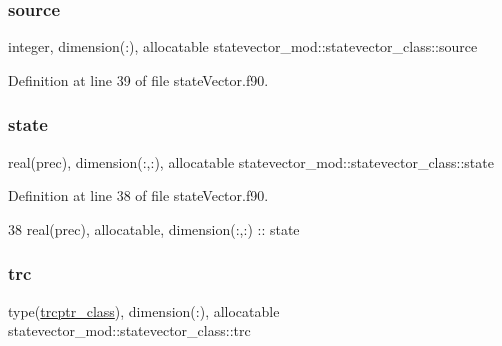 \subsubsection{\texorpdfstring{source}{source}}
{\footnotesize\ttfamily integer, dimension(\+:), allocatable statevector\+\_\+mod\+::statevector\+\_\+class\+::source\hspace{0.3cm}{\ttfamily [private]}}



Definition at line 39 of file state\+Vector.\+f90.

\mbox{\label{structstatevector__mod_1_1statevector__class_a2934e9cc937ca318cbbe490dd391cf88}} 
\subsubsection{\texorpdfstring{state}{state}}
{\footnotesize\ttfamily real(prec), dimension(\+:,\+:), allocatable statevector\+\_\+mod\+::statevector\+\_\+class\+::state\hspace{0.3cm}{\ttfamily [private]}}



Definition at line 38 of file state\+Vector.\+f90.


\begin{DoxyCode}
38         \textcolor{keywordtype}{real(prec)}, \textcolor{keywordtype}{allocatable}, \textcolor{keywordtype}{dimension(:,:)} :: state
\end{DoxyCode}
\mbox{\label{structstatevector__mod_1_1statevector__class_a510497a5645951832de30b8fd89a1d33}} 
\subsubsection{\texorpdfstring{trc}{trc}}
{\footnotesize\ttfamily type(\mbox{\hyperlink{structstatevector__mod_1_1trcptr__class}{trcptr\+\_\+class}}), dimension(\+:), allocatable statevector\+\_\+mod\+::statevector\+\_\+class\+::trc\hspace{0.3cm}{\ttfamily [private]}}



